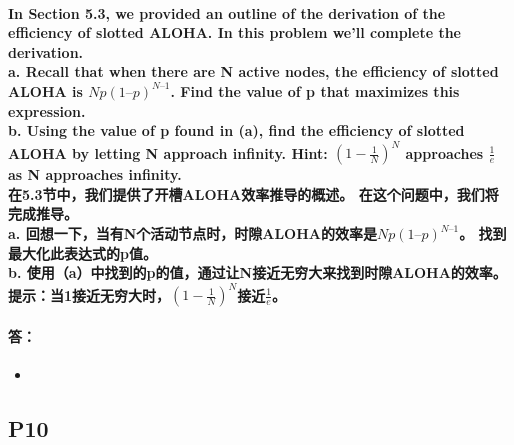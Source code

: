 \documentclass[a4paper]{ctexart}
\begin{document}
\paragraph*{In Section 5.3, we provided an outline of the derivation of the efficiency of slotted ALOHA. In this problem we’ll complete the derivation. \\
a. Recall that when there are N active nodes, the efficiency of slotted ALOHA is $Np(1 – p)^{N–1}$. Find the value of p that maximizes this expression.\\
b. Using the value of p found in (a), find the efficiency of slotted ALOHA by letting N approach infinity. Hint: $(1 -\frac{1}{N})^N$ approaches $\frac{1}{e}$ as N approaches infinity.\\
在5.3节中，我们提供了开槽ALOHA效率推导的概述。 在这个问题中，我们将完成推导。\\
a. 回想一下，当有N个活动节点时，时隙ALOHA的效率是$Np(1 – p)^{N–1}$。 找到最大化此表达式的p值。\\
b. 使用（a）中找到的p的值，通过让N接近无穷大来找到时隙ALOHA的效率。 提示：当1接近无穷大时，$(1 -\frac{1}{N})^N$接近$\frac{1}{e}$。
\\}
\paragraph*{答：} 
\begin{itemize}
    \item 
\end{itemize}

\subsection*{P10}
\end{document}
